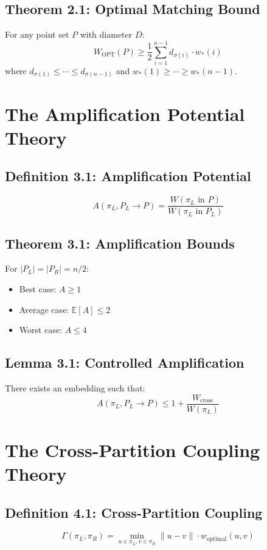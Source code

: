\documentclass{article}
\begin{document}
\subsection*{Theorem 2.1: Optimal Matching Bound}
For any point set $P$ with diameter $D$:
\[
	W_{\text{OPT}}(P) \geq \frac{1}{2} \sum_{i=1}^{n-1} d_{\sigma(i)} \cdot w_*(i)
\]
where $d_{\sigma(1)} \leq \cdots \leq d_{\sigma(n-1)}$ and $w_*(1) \geq \cdots \geq w_*(n-1)$.

\section{The Amplification Potential Theory}

\subsection*{Definition 3.1: Amplification Potential}
\[
	A(\pi_L, P_L \to P) = \frac{W(\pi_L \text{ in } P)}{W(\pi_L \text{ in } P_L)}
\]

\subsection*{Theorem 3.1: Amplification Bounds}
For $|P_L| = |P_R| = n/2$:
\begin{itemize}
	\item Best case: $A \geq 1$
	\item Average case: $\mathbb{E}[A] \leq 2$
	\item Worst case: $A \leq 4$
\end{itemize}

\subsection*{Lemma 3.1: Controlled Amplification}
There exists an embedding such that:
\[
	A(\pi_L, P_L \to P) \leq 1 + \frac{W_{\text{cross}}}{W(\pi_L)}
\]

\section{The Cross-Partition Coupling Theory}

\subsection*{Definition 4.1: Cross-Partition Coupling}
\[
	\Gamma(\pi_L, \pi_R) = \min_{u \in \pi_L, v \in \pi_R} \|u - v\| \cdot w_{\text{optimal}}(u, v)
\]
\end{document}
